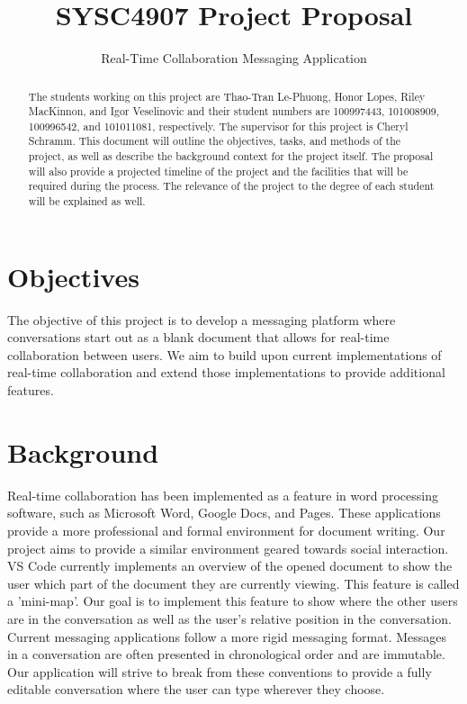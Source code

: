 \documentclass[letterpaper]{report}
\begin{document}
	\title{SYSC4907 Project Proposal}
	\author{Real-Time Collaboration Messaging Application}
	\date{}
	\maketitle

	\begin{abstract}
		The students working on this project are Thao-Tran Le-Phuong, Honor
		Lopes, Riley MacKinnon, and Igor Veselinovic and their student numbers
		are 100997443, 101008909, 100996542, and 101011081, respectively. The
		supervisor for this project is Cheryl Schramm. This document will
		outline the objectives, tasks, and methods of the project, as well as
		describe the background context for the project itself. The proposal
		will also provide a projected timeline of the project and the
		facilities that will be required during the process. The relevance of
		the project to the degree of each student will be explained as well.
	\end{abstract}

	\tableofcontents

	\pagebreak

	\section*{Objectives}
	\markright{}
	The objective of this project is to develop a messaging platform where
	conversations start out as a blank document that allows for real-time
	collaboration between users. We aim to build upon current implementations
	of real-time collaboration and extend those implementations to provide
	additional features.

	\section*{Background}
	\markright{}
	Real-time collaboration has been implemented as a feature in word
	processing software, such as Microsoft Word, Google Docs, and Pages. These
	applications provide a more professional and formal environment for
	document writing. Our project aims to provide a similar environment geared
	towards social interaction. VS Code currently implements an overview of the
	opened document to show the user which part of the document they are
	currently viewing. This feature is called a 'mini-map'. Our goal is to
	implement this feature to show where the other users are in the
	conversation as well as the user's relative position in the conversation.
	Current messaging applications follow a more rigid messaging format.
	Messages in a conversation are often presented in chronological order and 
	are immutable. Our application will strive to break from these conventions
	to provide a fully editable conversation where the user can type wherever
	they choose.
\end{document}
